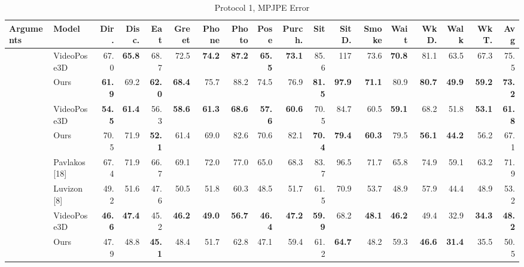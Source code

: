 \documentclass[10pt,twocolumn,letterpaper]{article}
\begin{document}
\begin{center}
\begin{table}
\small
\setlength\tabcolsep{2.3pt}
\begin{tabular}{l|l|rrrrrrrrrrrrrrrr}
Arguments & Model & Dir. & Disc. & Eat & Greet & Phone & Photo & Pose & Purch. & Sit & SitD. & Smoke & Wait & WkD. & Walk & WkT. & \textbf{Avg} \\

\hline
 & VideoPose3D & 67.0 & \textbf{65.8} & 68.7 & 72.5 & \textbf{74.2} & \textbf{87.2} & \textbf{65.5} & \textbf{73.1} & 85.6 & 117 & 73.6 & \textbf{70.8} & 81.1 & 63.5 & 67.3 & 75.5 \\
 & Ours & \textbf{61.9} & 69.2 & \textbf{62.0} & \textbf{68.4} & 75.7 & 88.2 & 74.5 & 76.9 & \textbf{81.5} & \textbf{97.9} & \textbf{71.1} & 80.9 & \textbf{80.7} & \textbf{49.9} & \textbf{59.2} & \textbf{73.2}\\

\hline


 & VideoPose3D & \textbf{54.5} & \textbf{61.4} & 56.3 & \textbf{58.6} & \textbf{61.3} & \textbf{68.6} & \textbf{57.6} & \textbf{60.6} & 70.5 & 84.7 & 60.5 & \textbf{59.1} & 68.2 & 51.8 & \textbf{53.1} & \textbf{61.8} \\
 & Ours & 70.5 & 71.9 & \textbf{52.1} & 61.4 & 69.0 & 82.6 & 70.6 & 82.1 & \textbf{70.4} & \textbf{79.4} & \textbf{60.3} & 79.5 & \textbf{56.1} & \textbf{44.2} & 56.2 & 67.1\\
\hline

& Pavlakos [18] & 67.4 & 71.9 & 66.7 & 69.1 & 72.0 & 77.0 & 65.0 & 68.3 & 83.7 & 96.5 & 71.7 & 65.8 & 74.9 & 59.1 & 63.2 & 71.9 \\
& Luvizon [8] & 49.2 & 51.6 & 47.6 & 50.5 & 51.8 & 60.3 & 48.5 & 51.7 & 61.5 & 70.9 & 53.7 & 48.9 & 57.9 & 44.4 & 48.9 & 53.2\\
 & VideoPose3D & \textbf{46.6} & \textbf{47.4} & 45.2 & \textbf{46.2} & \textbf{49.0} & \textbf{56.7} & \textbf{46.4} & \textbf{47.2} & \textbf{59.9} & 68.2 & \textbf{48.1} & \textbf{46.2} & 49.4 & 32.9 & \textbf{34.3} & \textbf{48.2}\\
& Ours & 47.9 & 48.8 & \textbf{45.1} & 48.4 & 51.7 & 62.8 & 47.1 & 59.4 & 61.2 & \textbf{64.7} & 48.2 & 59.3 & \textbf{46.6} & \textbf{31.4} & 35.5 & 50.5\\
 
\hline 

\hline
\end{tabular}

\caption{Protocol 1, MPJPE Error}
\label{tab:MPJPE Error}
\end{table}
\end{center}
\end{document}
